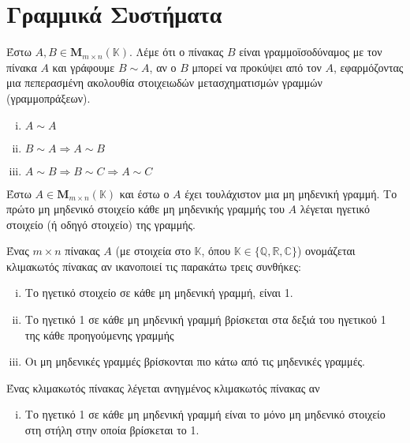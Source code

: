 






\chapter*{Γραμμικά Συστήματα}

\begin{dfn}
  Έστω $ A,B \in \textbf{M}_{m \times n}(\mathbb{K}) $. Λέμε ότι ο πίνακας $B$ είναι 
  \textcolor{Col1}{γραμμοϊσοδύναμος} με τον πίνακα $A$ και γράφουμε $ B \sim A $, 
  αν ο $B$ μπορεί να προκύψει από τον $A$, εφαρμόζοντας μια πεπερασμένη ακολουθία 
  στοιχειωδών μετασχηματισμών γραμμών (γραμμοπράξεων).
\end{dfn}

\begin{rem}
\item {}
  \begin{enumerate}[i)]
    \item $ A \sim A $
    \item $ B \sim A \Rightarrow A \sim B$
    \item $ A \sim B \Rightarrow B \sim C \Rightarrow A \sim C$
  \end{enumerate}
\end{rem}

\begin{dfn}
  Έστω $ A \in \textbf{M}_{m \times n}(\mathbb{K}) $ και έστω ο $A$ έχει τουλάχιστον μια
  μη μηδενική γραμμή. Το πρώτο μη μηδενικό στοιχείο κάθε μη μηδενικής γραμμής του 
  $A$ λέγεται \textcolor{Col1}{ηγετικό} στοιχείο (ή \textcolor{Col1}{οδηγό} στοιχείο) 
  της γραμμής.
\end{dfn}

\begin{dfn}
  Ένας $ m \times n $ πίνακας $A$ (με στοιχεία στο $\mathbb{K}$, όπου $ \mathbb{K} \in
  \{ \mathbb{Q}, \mathbb{R}, \mathbb{C} \} $) ονομάζεται \textcolor{Col1}{κλιμακωτός} 
  πίνακας αν ικανοποιεί τις παρακάτω τρεις συνθήκες:
  \begin{enumerate}[i)]
    \item Το ηγετικό στοιχείο σε κάθε μη μηδενική γραμμή, είναι 1.
    \item Το ηγετικό 1 σε κάθε μη μηδενική γραμμή βρίσκεται στα δεξιά του ηγετικού 1 
      της κάθε προηγούμενης γραμμής
    \item Οι μη μηδενικές γραμμές βρίσκονται πιο κάτω από τις μηδενικές γραμμές.
  \end{enumerate}
  Ένας κλιμακωτός πίνακας λέγεται \textcolor{Col1}{ανηγμένος κλιμακωτός} πίνακας αν 
  \begin{enumerate}[i), start=4]
    \item Το ηγετικό 1 σε κάθε μη μηδενική γραμμή είναι το μόνο μη μηδενικό στοιχείο στη
      στήλη στην οποία βρίσκεται το 1.
  \end{enumerate}
\end{dfn}

